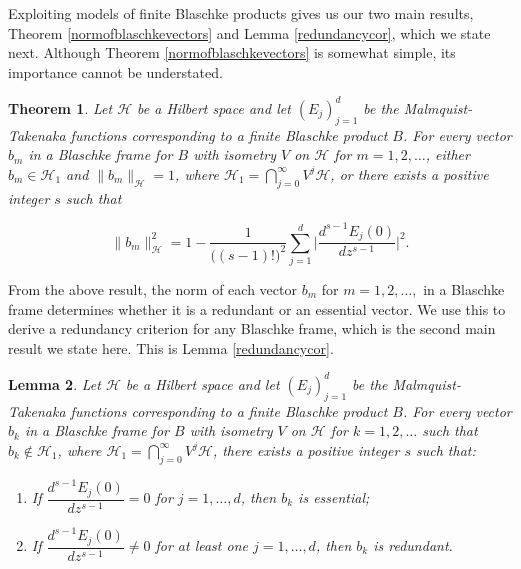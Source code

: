 \documentclass[10pt, reqno]{amsart}
\newtheorem{theorem}{Theorem}[section]
\newtheorem{lemma}[theorem]{Lemma}
\theoremstyle{definition}
\numberwithin{equation}{section}
\begin{document}
Exploiting models of finite Blaschke products gives us our two main results, Theorem \ref{normofblaschkevectors} and Lemma \ref{redundancycor}, which we state next. Although Theorem \ref{normofblaschkevectors} is somewhat simple, its importance cannot be understated.

\begin{theorem}\label{normofblaschkevectorsintro}
Let $\mathcal{H}$ be a Hilbert space and let $(E_{j})_{j=1}^{d}$ be the Malmquist-Takenaka functions corresponding to a finite Blaschke product $B$. For every vector $b_{m}$ in a Blaschke frame for $B$ with isometry $V$ on $\mathcal{H}$ for $m=1,2,\hdots$, either $b_{m}\in\mathcal{H}_{1}$ and $\|b_{m}\|_{\mathcal{H}}=1$, where $\mathcal{H}_{1}=\bigcap_{j=0}^{\infty}V^{j}\mathcal{H}$, or there exists a positive integer $s$ such that

$$\|b_{m}\|^{2}_{\mathcal{H}}=1 - \dfrac{1}{\big((s-1)!\big)^{2}}\sum_{j=1}^{d}\Bigg\lvert\dfrac{d^{s-1}E_{j}(0)}{dz^{s-1}}\Bigg\rvert^{2}.$$

\end{theorem}

\noindent From the above result, the norm of each vector $b_{m}$ for $m=1,2,\hdots,$ in a Blaschke frame determines whether it is a redundant or an essential vector. We use this to derive a redundancy criterion for any Blaschke frame, which is the second main result we state here. This is Lemma \ref{redundancycor}. 

\begin{lemma}\label{redundancycorintro}
Let $\mathcal{H}$ be a Hilbert space and let $(E_{j})_{j=1}^{d}$ be the Malmquist-Takenaka functions corresponding to a finite Blaschke product $B$. For every vector $b_{k}$ in a Blaschke frame for $B$ with isometry $V$ on $\mathcal{H}$ for $k=1,2,\hdots$ such that $b_{k}\not\in\mathcal{H}_{1}$, where $\mathcal{H}_{1}=\bigcap_{j=0}^{\infty}V^{j}\mathcal{H}$, there exists a positive integer $s$ such that:

\begin{enumerate}
     \item  If $\dfrac{d^{s-1}E_{j}(0)}{dz^{s-1}} = 0$ for $j=1,\hdots,d$, then $b_{k}$ is essential;
     \vspace{0.2cm}
         \item  If $\dfrac{d^{s-1}E_{j}(0)}{dz^{s-1}} \neq 0$ for at least one $j=1,\hdots,d$, then $b_{k}$ is redundant.
\end{enumerate}
\end{lemma}
\end{document}
